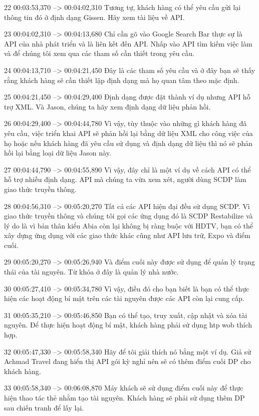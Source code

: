22
00:03:53,370 --> 00:04:02,310
Tương tự, khách hàng có thể yêu cầu gửi lại thông tin đó ở định dạng Gissen.  Hãy xem tài liệu về API.

23
00:04:02,310 --> 00:04:13,680
Chỉ cần gõ vào Google Search Bar thực sự là API của nhà phát triển và là liên kết đến API.  Nhấp vào API tìm kiếm việc làm và để chúng tôi xem qua các tham số cần thiết trong yêu cầu.

24
00:04:13,710 --> 00:04:21,450
Đây là các tham số yêu cầu và ở đây bạn sẽ thấy rằng khách hàng sẽ cần thiết lập định dạng mà họ quan tâm theo mặc định.

25
00:04:21,450 --> 00:04:29,400
Định dạng được đặt thành ví dụ nhưng API hỗ trợ XML.  Và Jason, chúng ta hãy xem định dạng dữ liệu phản hồi.

26
00:04:29,400 --> 00:04:44,780
Vì vậy, tùy thuộc vào những gì khách hàng đã yêu cầu, việc triển khai API sẽ phản hồi lại bằng dữ liệu XML cho công việc của họ hoặc nếu khách hàng đã yêu cầu sử dụng và định dạng dữ liệu thì nó sẽ phản hồi lại bằng loại dữ liệu Jason này.

27
00:04:44,790 --> 00:04:55,890
Vì vậy, đây chỉ là một ví dụ về cách API có thể hỗ trợ nhiều định dạng.  API mà chúng ta vừa xem xét, người dùng SCDP làm giao thức truyền thông.

28
00:04:56,310 --> 00:05:20,270
Tất cả các API hiện đại đều sử dụng SCDP.  Vì giao thức truyền thông và chúng tôi gọi các ứng dụng đó là SCDP Restabilize và lý do là vì bản thân kiểu Abia còn lại không bị ràng buộc với HDTV, bạn có thể xây dựng ứng dụng với các giao thức khác cũng như API lưu trữ, Expo và điểm cuối.

29
00:05:20,270 --> 00:05:26,940
Và điểm cuối này được sử dụng để quản lý trạng thái của tài nguyên.  Từ khóa ở đây là quản lý nhà nước.

30
00:05:27,410 --> 00:05:34,780
Vì vậy, điều đó cho bạn biết là bạn có thể thực hiện các hoạt động bí mật trên các tài nguyên được các API còn lại cung cấp.

31
00:05:35,210 --> 00:05:46,850
Bạn có thể tạo, truy xuất, cập nhật và xóa tài nguyên.  Để thực hiện hoạt động bí mật, khách hàng phải sử dụng htp wob thích hợp.

32
00:05:47,330 --> 00:05:58,340
Hãy để tôi giải thích nó bằng một ví dụ.  Giả sử Achmad Travel đang hiển thị API gói kỳ nghỉ nên sẽ có thêm điểm cuối DP cho khách hàng.

33
00:05:58,340 --> 00:06:08,870
Máy khách sẽ sử dụng điểm cuối này để thực hiện thao tác thẻ nhằm tạo tài nguyên.  Khách hàng sẽ phải sử dụng thêm DP sau chiến tranh để lấy lại.

